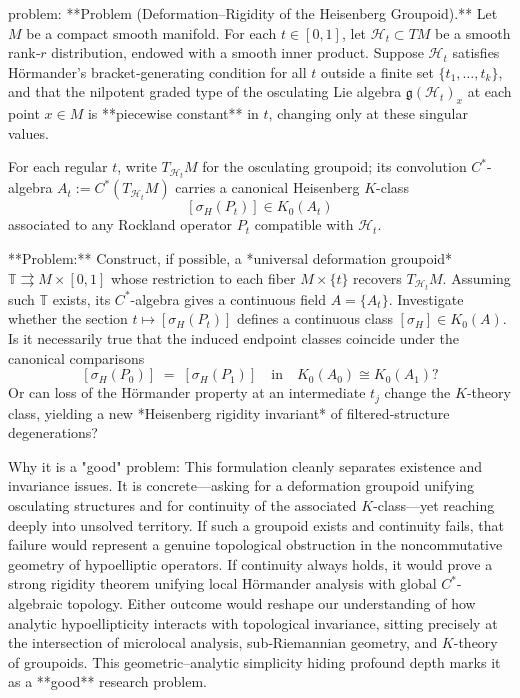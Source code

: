 problem:  
**Problem (Deformation–Rigidity of the Heisenberg Groupoid).**  
Let \( M \) be a compact smooth manifold.  
For each \( t\in[0,1] \), let \( \mathcal H_t\subset TM \) be a smooth rank‑\(r\) distribution, endowed with a smooth inner product.  
Suppose \( \mathcal H_t \) satisfies Hörmander’s bracket‑generating condition for all \(t\) outside a finite set \( \{t_1,\dots,t_k\} \), and that the nilpotent graded type of the osculating Lie algebra \( \mathfrak g(\mathcal H_t)_x \) at each point \(x\in M\) is **piecewise constant** in \( t \), changing only at these singular values.

For each regular \( t\), write \(T_{\mathcal H_t}M\) for the osculating groupoid; its convolution \(C^*\)-algebra \(A_t := C^*(T_{\mathcal H_t}M)\) carries a canonical Heisenberg \(K\)-class 
\[
[\sigma_H(P_t)] \in K_0(A_t)
\]
associated to any Rockland operator \(P_t\) compatible with \( \mathcal H_t\).

**Problem:**  
Construct, if possible, a *universal deformation groupoid* \( \mathbb T \rightrightarrows M\times[0,1] \) whose restriction to each fiber \(M\times\{t\}\) recovers \(T_{\mathcal H_t}M\).  
Assuming such \( \mathbb T\) exists, its \(C^*\)-algebra gives a continuous field \(A=\{A_t\}\).  
Investigate whether the section \(t\mapsto [\sigma_H(P_t)]\) defines a continuous class \( [\sigma_H] \in K_0(A)\).  
Is it necessarily true that the induced endpoint classes coincide under the canonical comparisons  
\[
[\sigma_H(P_0)] \;=\; [\sigma_H(P_1)] \quad\text{in}\quad K_0(A_0)\cong K_0(A_1)?
\]
Or can loss of the Hörmander property at an intermediate \(t_j\) change the \(K\)-theory class, yielding a new *Heisenberg rigidity invariant* of filtered‑structure degenerations?

Why it is a "good" problem:  
This formulation cleanly separates existence and invariance issues.  
It is concrete—asking for a deformation groupoid unifying osculating structures and for continuity of the associated \(K\)-class—yet reaching deeply into unsolved territory.  
If such a groupoid exists and continuity fails, that failure would represent a genuine topological obstruction in the noncommutative geometry of hypoelliptic operators.  
If continuity always holds, it would prove a strong rigidity theorem unifying local Hörmander analysis with global \(C^*\)-algebraic topology.  
Either outcome would reshape our understanding of how analytic hypoellipticity interacts with topological invariance, sitting precisely at the intersection of microlocal analysis, sub‑Riemannian geometry, and \(K\)-theory of groupoids.  
This geometric–analytic simplicity hiding profound depth marks it as a **good** research problem.